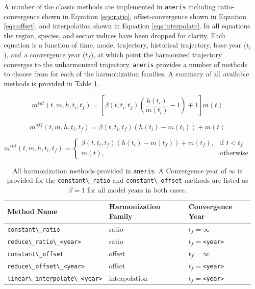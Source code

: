 \documentclass[review]{elsarticle}
\newcommand{\code}[1]{\lstinline[basicstyle=\ttfamily\color{black}]|#1|}
\newcommand{\codeb}[1]{\texttt{#1}}
\begin{document}
A number of the classic methods are implemented in \code{aneris} including
ratio-convergence shown in Equation \ref{eqs:ratio}, offset-convergence shown in
Equation \ref{eqs:offset}, and interpolation shown in Equation
\ref{eqs:interpolate}. In all equations the region, species, and sector indices
have been dropped for clarity. Each equation is a function of time, model
trajectory, historical trajectory, base year ($t_i$), and a convergence year
($t_f$), at which point the harmonized trajectory converges to the unharmonized
trajectory. \codeb{aneris} provides a number of methods to choose from for each
of the harmonization families. A summary of all available methods is provided in
Table \ref{tab:meths}. 


\begin{equation}\label{eqs:ratio}
  m^{rat}(t, m, h, t_i, t_f) = [\beta(t, t_i, t_f) (\frac{h(t_i)}{m(t_i)} - 1) + 1] m(t)
\end{equation}

\begin{equation}\label{eqs:offset}
  m^{off}(t, m, h, t_i, t_f) = \beta(t, t_i, t_f) (h(t_i) - m(t_i)) + m(t)
\end{equation}
  
\begin{equation}\label{eqs:interpolate}
  m^{int}(t, m, h, t_i, t_f) =
  \begin{cases}
    \beta(t, t_i, t_f) (h(t_i) - m(t_f)) + m(t_f), & \text{if } t < t_f\\
    m(t), & \text{otherwise}
  \end{cases}
\end{equation}


\begin{table}[h!]
\centering
\caption{All harmonization methods provided in \code{aneris}. A Convergence year of $\infty$ is provided for the \code{constant\_ratio} and \code{constant\_offset} methods are listed as $\beta = 1$ for all model years in both cases.}
\label{tab:meths}
\begin{tabular}{|l|l|l|}
\hline
Method Name                             & Harmonization Family & Convergence Year\\
\hline
\code{constant\_ratio}                  & ratio              & $t_f = \infty$\\
\code{reduce\_ratio\_<year>}            & ratio              & $t_f = $\code{<year>}\\
\code{constant\_offset}                 & offset             & $t_f = \infty$\\
\code{reduce\_offset\_<year>}           & offset             & $t_f = $\code{<year>}\\
\code{linear\_interpolate\_<year>}      & interpolation      & $t_f = $\code{<year>}\\
\hline
\end{tabular}
\end{table}
\end{document}
